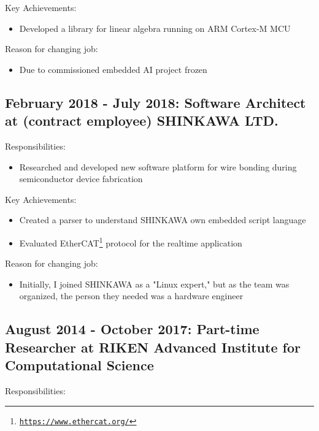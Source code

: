 \documentclass[letterpaper]{article}
\begin{document}
\noindent Key Achievements:

\begin{itemize}
  \item Developed a library for linear algebra running on ARM Cortex-M MCU
\end{itemize}

\noindent Reason for changing job:

\begin{itemize}
  \item Due to commissioned embedded AI project frozen
\end{itemize}

\subsection*{February 2018 - July 2018: Software Architect at (contract employee) SHINKAWA LTD.}

\noindent Responsibilities:

\begin{itemize}
  \item Researched and developed new software platform for wire bonding during semiconductor device fabrication
\end{itemize}

\noindent Key Achievements:

\begin{itemize}
  \item Created a parser to understand SHINKAWA own embedded script language
  \item Evaluated EtherCAT\footnote{\href{https://www.ethercat.org/}{\tt https://www.ethercat.org/}} protocol for the realtime application
\end{itemize}

\noindent Reason for changing job:

\begin{itemize}
  \item Initially, I joined SHINKAWA as a "Linux expert," but as the team was organized, the person they needed was a hardware engineer
\end{itemize}

\subsection*{August 2014 - October 2017: Part-time Researcher at RIKEN Advanced Institute for Computational Science}

\noindent Responsibilities:
\end{document}
